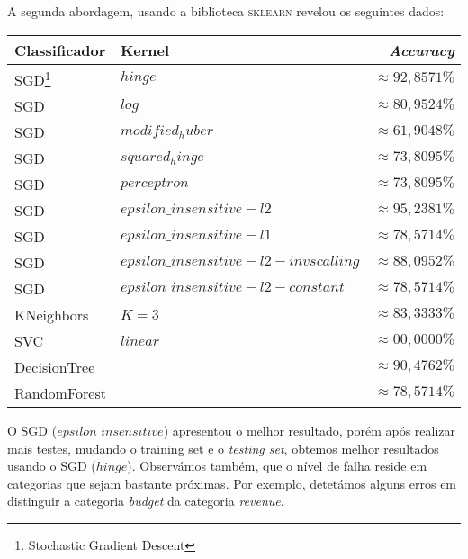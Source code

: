 \documentclass[12pt]{article}
\begin{document}
    A segunda abordagem, usando a biblioteca \textsc{sklearn} revelou os seguintes dados:
    \begin{center}
        \begin{tabular}{ l | l | r }
          \hline
          \textbf{Classificador} & \textbf{Kernel} & \textbf{\textit{Accuracy}} \\ \hline
          SGD\footnote{Stochastic Gradient Descent} & $hinge$ & $\approx 92,8571\%$ \\ \hline
          SGD & $log$ & $\approx 80,9524\%$ \\ \hline
          SGD & $modified_huber$ & $\approx 61,9048\%$ \\ \hline
          SGD & $squared_hinge$ & $\approx 73,8095\%$ \\ \hline
          SGD & $perceptron$ & $\approx 73,8095\%$ \\ \hline
          SGD & $epsilon\_insensitive-l2$ & $\approx 95,2381\%$ \\ \hline
          SGD & $epsilon\_insensitive-l1$ & $\approx 78,5714\%$ \\ \hline
          SGD & $epsilon\_insensitive-l2-invscalling$ & $\approx 88,0952\%$ \\ \hline
          SGD & $epsilon\_insensitive-l2-constant$ & $\approx 78,5714\%$ \\ \hline
          KNeighbors & $K = 3$ & $\approx 83,3333\%$ \\ \hline
          SVC & $linear$ & $\approx 00,0000\%$ \\ \hline
          DecisionTree & $ $ & $\approx 90,4762\%$ \\ \hline
          RandomForest & $ $ & $\approx 78,5714\%$ \\ \hline
          
          
        \end{tabular}
      \end{center}
      
    O SGD ($epsilon\_insensitive$) apresentou o melhor resultado, porém após realizar mais testes, mudando
    o training set e o \textit{testing set}, obtemos melhor resultados usando o SGD ($hinge$).
    Observámos também, que o nível de falha reside em categorias que sejam bastante próximas. Por exemplo, 
    detetámos alguns erros em distinguir a categoria \textit{budget} da categoria \textit{revenue}. \newline
\end{document}
